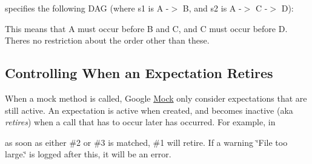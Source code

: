\begin{DoxyCode}{0}
\DoxyCodeLine{}
\DoxyCodeLine{}
\end{DoxyCode}


specifies the following D\+AG (where {\ttfamily s1} is {\ttfamily A -\/$>$ B}, and {\ttfamily s2} is {\ttfamily A -\/$>$ C -\/$>$ D})\+:


\begin{DoxyCode}{0}
\DoxyCodeLine{     |}
\DoxyCodeLine{     |}
\end{DoxyCode}


This means that A must occur before B and C, and C must occur before D. There\textquotesingle{}s no restriction about the order other than these.

\subsection*{Controlling When an Expectation Retires}

When a mock method is called, Google \mbox{\hyperlink{class_mock}{Mock}} only consider expectations that are still active. An expectation is active when created, and becomes inactive (aka {\itshape retires}) when a call that has to occur later has occurred. For example, in


\begin{DoxyCode}{0}
\DoxyCodeLine{}
\DoxyCodeLine{}
\end{DoxyCode}


as soon as either \#2 or \#3 is matched, \#1 will retire. If a warning {\ttfamily \char`\"{}\+File too large.\char`\"{}} is logged after this, it will be an error.

